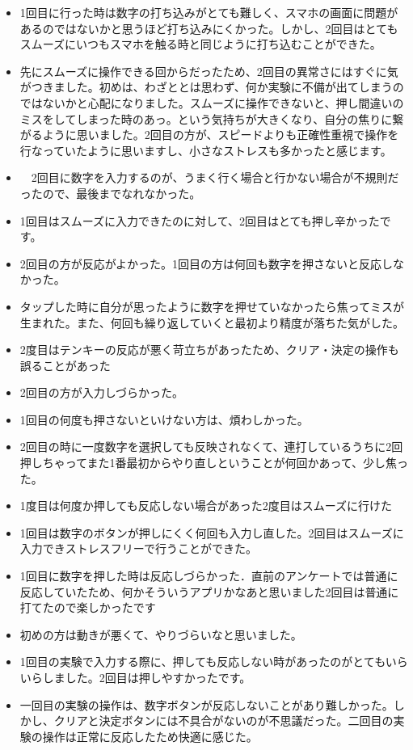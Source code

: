 \begin{itemize}
  \item 1回目に行った時は数字の打ち込みがとても難しく、スマホの画面に問題があるのではないかと思うほど打ち込みにくかった。しかし、2回目はとてもスムーズにいつもスマホを触る時と同じように打ち込むことができた。
  \item 先にスムーズに操作できる回からだったため、2回目の異常さにはすぐに気がつきました。初めは、わざととは思わず、何か実験に不備が出てしまうのではないかと心配になりました。スムーズに操作できないと、押し間違いのミスをしてしまった時のあっ。という気持ちが大きくなり、自分の焦りに繋がるように思いました。2回目の方が、スピードよりも正確性重視で操作を行なっていたように思いますし、小さなストレスも多かったと感じます。
  \item 　2回目に数字を入力するのが、うまく行く場合と行かない場合が不規則だったので、最後までなれなかった。
  \item 1回目はスムーズに入力できたのに対して、2回目はとても押し辛かったです。
  \item 2回目の方が反応がよかった。1回目の方は何回も数字を押さないと反応しなかった。
  \item タップした時に自分が思ったように数字を押せていなかったら焦ってミスが生まれた。また、何回も繰り返していくと最初より精度が落ちた気がした。
  \item 2度目はテンキーの反応が悪く苛立ちがあったため、クリア・決定の操作も誤ることがあった
  \item 2回目の方が入力しづらかった。
  \item 1回目の何度も押さないといけない方は、煩わしかった。
  \item 2回目の時に一度数字を選択しても反映されなくて、連打しているうちに2回押しちゃってまた1番最初からやり直しということが何回かあって、少し焦った。
  \item 1度目は何度か押しても反応しない場合があった2度目はスムーズに行けた
  \item 1回目は数字のボタンが押しにくく何回も入力し直した。2回目はスムーズに入力できストレスフリーで行うことができた。
  \item 1回目に数字を押した時は反応しづらかった．直前のアンケートでは普通に反応していたため、何かそういうアプリかなあと思いました2回目は普通に打てたので楽しかったです
  \item 初めの方は動きが悪くて、やりづらいなと思いました。
  \item 1回目の実験で入力する際に、押しても反応しない時があったのがとてもいらいらしました。2回目は押しやすかったです。
  \item 一回目の実験の操作は、数字ボタンが反応しないことがあり難しかった。しかし、クリアと決定ボタンには不具合がないのが不思議だった。二回目の実験の操作は正常に反応したため快適に感じた。

\end{itemize}
